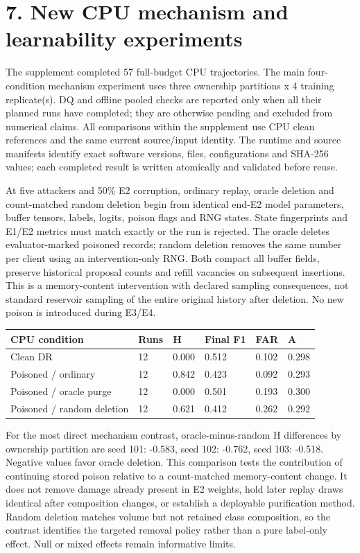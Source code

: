 \documentclass[
  10pt,
  a4paper,
]{article}
\begin{document}
\hypertarget{new-cpu-mechanism-and-learnability-experiments}{%
\section{7. New CPU mechanism and learnability
experiments}\label{new-cpu-mechanism-and-learnability-experiments}}

The supplement completed 57 full-budget CPU trajectories. The main
four-condition mechanism experiment uses three ownership partitions x 4
training replicate(s). DQ and offline pooled checks are reported only
when all their planned runs have completed; they are otherwise pending
and excluded from numerical claims. All comparisons within the
supplement use CPU clean references and the same current source/input
identity. The runtime and source manifests identify exact software
versions, files, configurations and SHA-256 values; each completed
result is written atomically and validated before reuse.

At five attackers and 50\% E2 corruption, ordinary replay, oracle
deletion and count-matched random deletion begin from identical end-E2
model parameters, buffer tensors, labels, logits, poison flags and RNG
states. State fingerprints and E1/E2 metrics must match exactly or the
run is rejected. The oracle deletes evaluator-marked poisoned records;
random deletion removes the same number per client using an
intervention-only RNG. Both compact all buffer fields, preserve
historical proposal counts and refill vacancies on subsequent
insertions. This is a memory-content intervention with declared sampling
consequences, not standard reservoir sampling of the entire original
history after deletion. No new poison is introduced during E3/E4.

\begin{longtable}[]{@{}llllll@{}}
\toprule
CPU condition & Runs & H & Final F1 & FAR & A \\
\midrule
\endhead
Clean DR & 12 & 0.000 & 0.512 & 0.102 & 0.298 \\
Poisoned / ordinary & 12 & 0.842 & 0.423 & 0.092 & 0.293 \\
Poisoned / oracle purge & 12 & 0.000 & 0.501 & 0.193 & 0.300 \\
Poisoned / random deletion & 12 & 0.621 & 0.412 & 0.262 & 0.292 \\
\bottomrule
\end{longtable}

For the most direct mechanism contrast, oracle-minus-random H
differences by ownership partition are seed 101: -0.583, seed 102:
-0.762, seed 103: -0.518. Negative values favor oracle deletion. This
comparison tests the contribution of continuing stored poison relative
to a count-matched memory-content change. It does not remove damage
already present in E2 weights, hold later replay draws identical after
composition changes, or establish a deployable purification method.
Random deletion matches volume but not retained class composition, so
the contrast identifies the targeted removal policy rather than a pure
label-only effect. Null or mixed effects remain informative limits.
\end{document}
